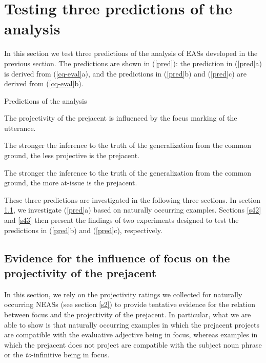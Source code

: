 \documentclass[11pt,fleqn]{article}
\newcommand{\6}{\mbox{$[\hspace*{-.6mm}[$}}
\newcommand{\9}{\mbox{$]\hspace*{-.6mm}]$}}
\begin{document}
\section{Testing three predictions of the analysis}\label{s4}

In this section we test three predictions of the analysis of EASs developed in the previous section. The predictions are shown in (\ref{pred}): the prediction in (\ref{pred}a) is derived from (\ref{cq-eval}a), and the predictions in (\ref{pred}b) and (\ref{pred}c) are derived from (\ref{cq-eval}b).

\begin{exe}
\ex\label{pred} Predictions of the analysis 

\begin{xlist}

\ex The projectivity of the prejacent is influenced by the focus marking of the utterance.

\ex The stronger the inference to the truth of the generalization from the common ground, the less projective is the prejacent.

\ex The stronger the inference to the truth of the generalization from the common ground, the more at-issue is the prejacent.

\end{xlist}
\end{exe}

These three predictions are investigated in the following three sections. In section \ref{s41}, we investigate (\ref{pred}a) based on naturally occurring examples. Sections \ref{s42} and \ref{s43} then present the findings of two experiments designed to test the predictions in (\ref{pred}b) and (\ref{pred}c), respectively.

\subsection{Evidence for the influence of focus on the projectivity of the prejacent}\label{s41}

In this section, we rely on the projectivity ratings we collected for naturally occurring NEASs (see section \ref{s2}) to provide tentative evidence for the relation between focus and the projectivity of the prejacent. In particular, what we are able to show is that naturally occurring examples in which the prejacent projects are compatible with the evaluative adjective being in focus, whereas examples in which the prejacent does not project are compatible with the subject noun phrase or the {\em to}-infinitive being in focus. 
\end{document}
